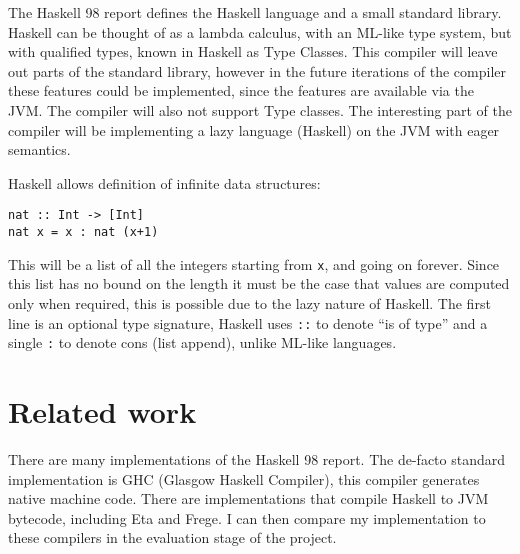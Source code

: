 \documentclass[float=false, crop=false]{standalone}
\begin{document}
The Haskell 98\cite{haskell98-spec} report defines the Haskell language 
and a small standard library.
Haskell can be thought of as a lambda calculus, with an ML-like type system,
but with qualified types\cite{qualified-types}, known in 
Haskell as Type Classes. This compiler will
leave out parts of the standard library, however in the future 
iterations of the compiler these 
features could be implemented, since the features are available via the JVM.
The compiler will also not support Type classes. The interesting
part of the compiler will be implementing a lazy language (Haskell)
on the JVM with eager semantics.

Haskell allows definition of infinite data structures:

\begin{lstlisting}
nat :: Int -> [Int]
nat x = x : nat (x+1)
\end{lstlisting}

This will be a list of all the integers starting from \texttt{x}, 
and going on forever. Since this list has no 
bound on the length it must be the case that values are computed
only when required, this is possible due to the lazy nature
of Haskell. The first line is an optional type signature, Haskell
uses \verb|::| to denote ``is of type'' and a single \verb|:| to denote cons (list
append), unlike ML-like languages.




  

\section{Related work}

There are many implementations of the Haskell 98 report.
The de-facto standard implementation is GHC\cite{ghc} (Glasgow Haskell
Compiler), this compiler generates native machine code. There
are implementations that compile Haskell to JVM bytecode, including Eta\cite{eta}
and Frege\cite{frege}. I can then compare my implementation to these compilers
in the evaluation stage of the project. 
\end{document}
